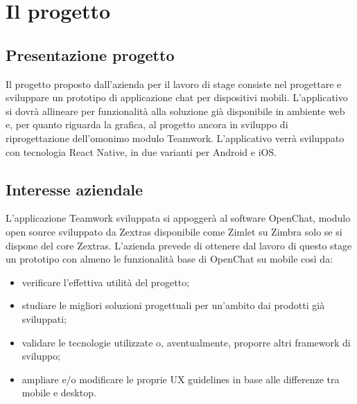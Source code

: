 
\chapter{Il progetto}\label{chap:project}
\section{Presentazione progetto}
Il progetto proposto dall'azienda per il lavoro di stage consiste nel progettare e sviluppare un prototipo di applicazione chat per dispositivi mobili. L'applicativo si dovrà allineare per funzionalità alla soluzione già disponibile in ambiente web e, per quanto riguarda la grafica, al progetto ancora in sviluppo di riprogettazione dell'omonimo modulo Teamwork.
L’applicativo verrà sviluppato con tecnologia React Native, in due varianti per Android e iOS.

\section{Interesse aziendale}
L'applicazione Teamwork sviluppata si appoggerà al software OpenChat, modulo open source  sviluppato da Zextras disponibile come Zimlet su Zimbra solo se si dispone del core Zextras.
L'azienda prevede di ottenere dal lavoro di questo stage un prototipo con almeno le funzionalità base di OpenChat su mobile così da:
\begin{itemize}
	\item verificare l'effettiva utilità del progetto;
	\item studiare le migliori soluzioni progettuali per un'ambito  dai prodotti già sviluppati;
	\item validare le tecnologie utilizzate o, aventualmente, proporre altri framework di sviluppo;
	\item ampliare e/o modificare le proprie UX guidelines in base alle differenze tra mobile e desktop.
\end{itemize}


